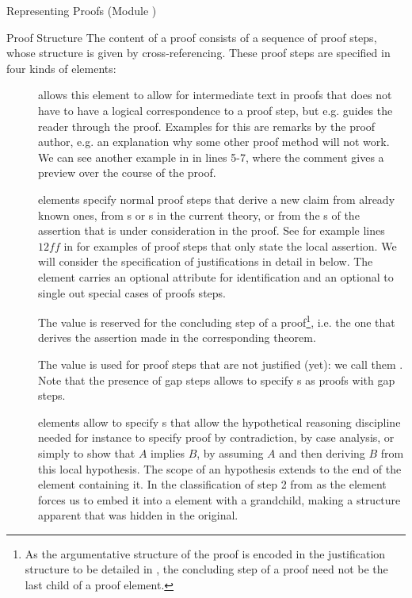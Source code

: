 \begin{tchapter}[id=proofs,short=Representing Proofs]{Representing Proofs (Module {})}
\begin{tsection}[id=proof-text]{Proof Structure}
The content of a proof consists of a sequence of proof steps, whose {}
structure is given by cross-referencing. These proof steps are
specified in four kinds of {\omdoc} elements:
\begin{description}
\item[{}] {\omdoc} allows this element to allow for intermediate text in
  proofs that does not have to have a logical correspondence to a proof step, but e.g.
  guides the reader through the proof. Examples for this are remarks by the proof author,
  e.g.  an explanation why some other proof method will not work. We can see another
  example in {} in lines 5-7, where the comment gives a
  preview over the course of the proof.
\item[{}] elements specify normal proof steps that derive a new claim from
  already known ones, from {s} or {s} in the current
  theory, or from the {s} of the assertion that is under
  consideration in the proof.  See for example lines $12ff$ in
  {} for examples of {} proof steps that only
  state the local assertion. We will consider the specification of justifications in
  detail in {} below. The {} element carries
  an optional {} attribute for identification and an
  optional {} to single out special cases of proofs steps.
  
  The value {} is reserved for the concluding step of a
  proof\footnote{As the argumentative structure of the proof is encoded in the
    justification structure to be detailed in {}, the
    concluding step of a proof need not be the last child of a proof element.}, i.e. the
  one that derives the assertion made in the corresponding theorem.  
  
  The value {} is used for proof steps that are not justified
  (yet): we call them {}. Note that the presence of gap steps allows
  {\omdoc} to specify {s} as proofs with gap steps.
\item[{}] elements allow to specify {s}
  that allow the hypothetical reasoning discipline needed for instance to specify proof by
  contradiction, by case analysis, or simply to show that $A$ implies $B$, by assuming $A$
  and then deriving $B$ from this local hypothesis. The scope of an hypothesis extends to
  the end of the {} element containing it. In
  {} the classification of step 2 from
  {} as the {} element {} forces
  us to embed it into a {} element with a {} grandchild,
  making a structure apparent that was hidden in the original.
  

\end{description}
\end{tsection}
\end{tchapter}
